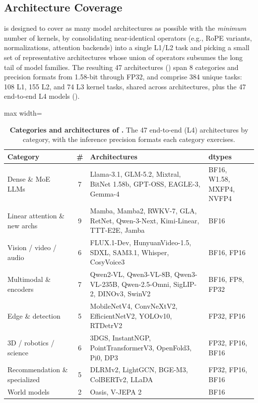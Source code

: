 \subsection{Architecture Coverage}
\label{fastkernels:sec:coverage}

\FastKernels is designed to cover as many model architectures as possible with the \emph{minimum} number of kernels, by consolidating near-identical operators (e.g., RoPE variants, normalizations, attention backends) into a single L1/L2 task and picking a small set of representative architectures whose union of operators subsumes the long tail of model families. The resulting 47 architectures () span 8 categories and precision formats from 1.58-bit through FP32, and comprise 384 unique tasks: 108 L1, 155 L2, and 74 L3 kernel tasks, shared across architectures, plus the 47 end-to-end L4 models ().

\begin{table}[t]
  \centering
  \caption{\textbf{Categories and architectures of \FastKernels.} The 47 end-to-end (L4) architectures by category, with the inference precision formats each category exercises.}
  \label{fastkernels:tab:categories}
  \small
  \setlength{\tabcolsep}{4pt}
  \begin{adjustbox}{max width=\linewidth}
  \begin{tabular}{@{}lc>{\raggedright\arraybackslash}p{7.2cm}l@{}}
  \toprule
  \textbf{Category} & \textbf{\#} & \textbf{Architectures} & \textbf{dtypes} \\
  \midrule
  Dense \& MoE LLMs & 7 & Llama-3.1, GLM-5.2, Mixtral, BitNet 1.58b, GPT-OSS, EAGLE-3, Gemma-4 & BF16, W1.58, MXFP4, NVFP4 \\
  Linear attention \& new archs & 9 & Mamba, Mamba2, RWKV-7, GLA, RetNet, Qwen-3-Next, Kimi-Linear, TTT-E2E, Jamba & BF16 \\
  Vision / video / audio & 6 & FLUX.1-Dev, HunyuanVideo-1.5, SDXL, SAM3.1, Whisper, CosyVoice3 & BF16, FP16 \\
  Multimodal \& encoders & 7 & Qwen2-VL, Qwen3-VL-8B, Qwen3-VL-235B, Qwen-2.5-Omni, SigLIP-2, DINOv3, SwinV2 & BF16, FP8, FP32 \\
  Edge \& detection & 5 & MobileNetV4, ConvNeXtV2, EfficientNetV2, YOLOv10, RTDetrV2 & FP32, FP16 \\
  3D / robotics / science & 6 & 3DGS, InstantNGP, PointTransformerV3, OpenFold3, Pi0, DP3 & FP32, FP16, BF16 \\
  Recommendation \& specialized & 5 & DLRMv2, LightGCN, BGE-M3, ColBERTv2, LLaDA & FP32, FP16, BF16 \\
  World models & 2 & Oasis, V-JEPA 2 & BF16 \\
  \bottomrule
  \end{tabular}
  \end{adjustbox}
\end{table}


